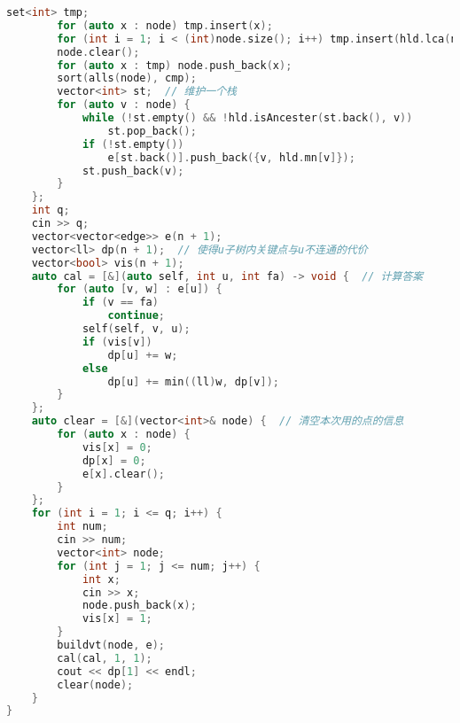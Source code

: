 \begin{lstlisting}[language=C++]
        set<int> tmp;
        for (auto x : node) tmp.insert(x);
        for (int i = 1; i < (int)node.size(); i++) tmp.insert(hld.lca(node[i - 1], node[i]));
        node.clear();
        for (auto x : tmp) node.push_back(x);
        sort(alls(node), cmp);
        vector<int> st;  // 维护一个栈
        for (auto v : node) {
            while (!st.empty() && !hld.isAncester(st.back(), v))
                st.pop_back();
            if (!st.empty())
                e[st.back()].push_back({v, hld.mn[v]});
            st.push_back(v);
        }
    };
    int q;
    cin >> q;
    vector<vector<edge>> e(n + 1);
    vector<ll> dp(n + 1);  // 使得u子树内关键点与u不连通的代价
    vector<bool> vis(n + 1);
    auto cal = [&](auto self, int u, int fa) -> void {  // 计算答案
        for (auto [v, w] : e[u]) {
            if (v == fa)
                continue;
            self(self, v, u);
            if (vis[v])
                dp[u] += w;
            else
                dp[u] += min((ll)w, dp[v]);
        }
    };
    auto clear = [&](vector<int>& node) {  // 清空本次用的点的信息
        for (auto x : node) {
            vis[x] = 0;
            dp[x] = 0;
            e[x].clear();
        }
    };
    for (int i = 1; i <= q; i++) {
        int num;
        cin >> num;
        vector<int> node;
        for (int j = 1; j <= num; j++) {
            int x;
            cin >> x;
            node.push_back(x);
            vis[x] = 1;
        }
        buildvt(node, e);
        cal(cal, 1, 1);
        cout << dp[1] << endl;
        clear(node);
    }
}
\end{lstlisting}
